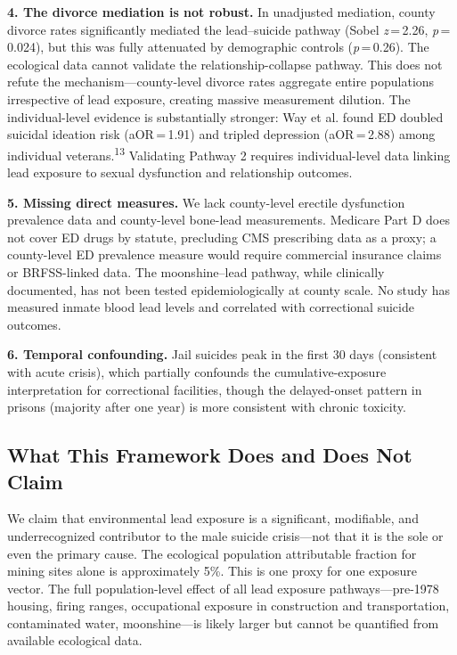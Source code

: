 \documentclass[11pt,twocolumn]{article}
\begin{document}
\textbf{4. The divorce mediation is not robust.} In unadjusted mediation, county divorce rates significantly mediated the lead--suicide pathway (Sobel \textit{z}\,=\,2.26, \textit{p}\,=\,0.024), but this was fully attenuated by demographic controls (\textit{p}\,=\,0.26). The ecological data cannot validate the relationship-collapse pathway. This does not refute the mechanism---county-level divorce rates aggregate entire populations irrespective of lead exposure, creating massive measurement dilution. The individual-level evidence is substantially stronger: Way et al. found ED doubled suicidal ideation risk (aOR\,=\,1.91) and tripled depression (aOR\,=\,2.88) among individual veterans.\textsuperscript{13} Validating Pathway 2 requires individual-level data linking lead exposure to sexual dysfunction and relationship outcomes.

\textbf{5. Missing direct measures.} We lack county-level erectile dysfunction prevalence data and county-level bone-lead measurements. Medicare Part D does not cover ED drugs by statute, precluding CMS prescribing data as a proxy; a county-level ED prevalence measure would require commercial insurance claims or BRFSS-linked data. The moonshine--lead pathway, while clinically documented, has not been tested epidemiologically at county scale. No study has measured inmate blood lead levels and correlated with correctional suicide outcomes.

\textbf{6. Temporal confounding.} Jail suicides peak in the first 30 days (consistent with acute crisis), which partially confounds the cumulative-exposure interpretation for correctional facilities, though the delayed-onset pattern in prisons (majority after one year) is more consistent with chronic toxicity.

\subsection{What This Framework Does and Does Not Claim}

We claim that environmental lead exposure is a significant, modifiable, and underrecognized contributor to the male suicide crisis---not that it is the sole or even the primary cause. The ecological population attributable fraction for mining sites alone is approximately 5\%. This is one proxy for one exposure vector. The full population-level effect of all lead exposure pathways---pre-1978 housing, firing ranges, occupational exposure in construction and transportation, contaminated water, moonshine---is likely larger but cannot be quantified from available ecological data.
\end{document}
